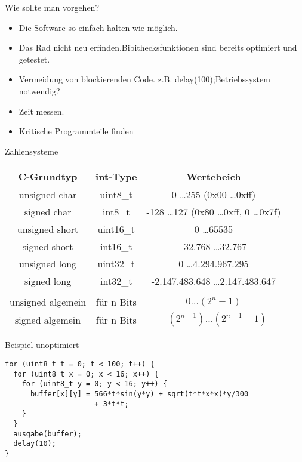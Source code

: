 \documentclass{beamer}
\begin{document}
\begin{frame}{Wie sollte man vorgehen?}

  \begin{itemize}
 \item Die Software so einfach halten wie möglich.\pause 
 \item Das Rad nicht neu erfinden.\newline Bibithecksfunktionen sind bereits optimiert und getestet.\pause
 \item Vermeidung von blockierenden Code. z.B. delay(100);\newline Betriebssystem notwendig? \pause
 \item Zeit messen.\pause
 \item Kritische Programmteile finden 
  \end{itemize}
\end{frame}

\begin{frame}{Zahlensysteme}

\begin{tabular}[c] {ccc}
C-Grundtyp 		& int-Type 	& Wertebeich \\
\hline
unsigned char 	& uint8\_t 	& 0 \ldots 255 (0x00 \ldots 0xff) \\
signed char 		& int8\_t 	& -128 \ldots 127 (0x80 \ldots 0xff, 0 \ldots 0x7f)\\
unsigned short 	& uint16\_t 	& 0 \ldots 65535 \\
signed short 		& int16\_t 	& -32.768 \ldots 32.767\\
unsigned long 	& uint32\_t 	& 0 \ldots 4.294.967.295\\
signed long 		& int32\_t 	& -2.147.483.648 \ldots 2.147.483.647\\
\hline
\\
unsigned algemein& f\"ur n Bits & $0 \ldots (2^n-1)$ \\
signed algemein& f\"ur n Bits& $-(2^{n-1}) \ldots (2^{n-1}-1)$ \\
\end{tabular}
\end{frame}

\begin{frame}[fragile]{Beispiel unoptimiert}
\begin{verbatim}
for (uint8_t t = 0; t < 100; t++) {
  for (uint8_t x = 0; x < 16; x++) {
    for (uint8_t y = 0; y < 16; y++) {
      buffer[x][y] = 566*t*sin(y*y) + sqrt(t*t*x*x)*y/300 
                     + 3*t*t;
    }
  }
  ausgabe(buffer);
  delay(10);	
}
\end{verbatim}
\end{frame}
\end{document}

